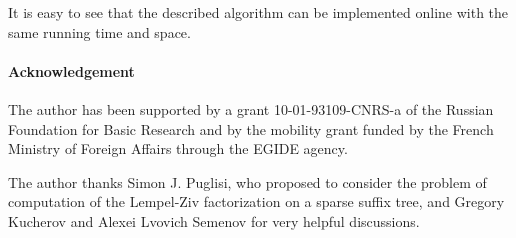 \documentclass[10pt]{llncs}
\begin{document}
It is easy to see that the described algorithm can be implemented online with the same running time and space.

\paragraph{Acknowledgement} 
The author has been supported by a grant 10-01-93109-CNRS-a of the Russian Foundation for Basic Research and by the mobility grant funded by the French Ministry of Foreign Affairs through the EGIDE agency.

The author thanks Simon J. Puglisi, who proposed to consider the problem of computation of the Lempel-Ziv factorization on a sparse suffix tree, and Gregory Kucherov and Alexei Lvovich Semenov for very helpful discussions.



\end{document}
